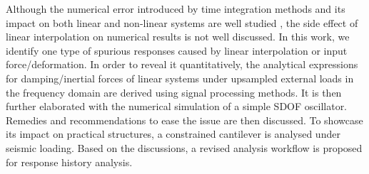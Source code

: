 Although the numerical error introduced by time integration methods and its impact on both linear and non-linear systems are well studied \citep[see, e.g.,][]{Chang2003,Chang2005}, the side effect of linear interpolation on numerical results is not well discussed. In this work, we identify one type of spurious responses caused by linear interpolation or input force/deformation. In order to reveal it quantitatively, the analytical expressions for damping/inertial forces of linear systems under upsampled external loads in the frequency domain are derived using signal processing methods. It is then further elaborated with the numerical simulation of a simple SDOF oscillator. Remedies and recommendations to ease the issue are then discussed. To showcase its impact on practical structures, a constrained cantilever is analysed under seismic loading. Based on the discussions, a revised analysis workflow is proposed for response history analysis.